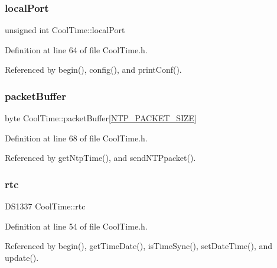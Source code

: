\subsubsection{\texorpdfstring{local\+Port}{localPort}}
{\footnotesize\ttfamily unsigned int Cool\+Time\+::local\+Port\hspace{0.3cm}{\ttfamily [private]}}



Definition at line 64 of file Cool\+Time.\+h.



Referenced by begin(), config(), and print\+Conf().

\mbox{\label{classCoolTime_a27e6abc82a5c2f72161956967005bec7}} 
\subsubsection{\texorpdfstring{packet\+Buffer}{packetBuffer}}
{\footnotesize\ttfamily byte Cool\+Time\+::packet\+Buffer\mbox{[}\hyperlink{CoolTime_8h_a56a6ea64006651b4f42adf713e244f06}{N\+T\+P\+\_\+\+P\+A\+C\+K\+E\+T\+\_\+\+S\+I\+ZE}\mbox{]}\hspace{0.3cm}{\ttfamily [private]}}



Definition at line 68 of file Cool\+Time.\+h.



Referenced by get\+Ntp\+Time(), and send\+N\+T\+Ppacket().

\mbox{\label{classCoolTime_afa77d58c0c21cfe8b7c27e34d82f07b9}} 
\subsubsection{\texorpdfstring{rtc}{rtc}}
{\footnotesize\ttfamily D\+S1337 Cool\+Time\+::rtc\hspace{0.3cm}{\ttfamily [private]}}



Definition at line 54 of file Cool\+Time.\+h.



Referenced by begin(), get\+Time\+Date(), is\+Time\+Sync(), set\+Date\+Time(), and update().

\mbox{\label{classCoolTime_ad2b9858f399108cb440dd1e908916f04}} 
